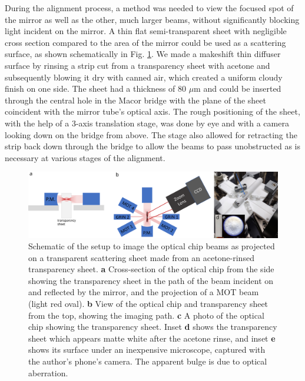 During the alignment process, a method was needed to view the focused spot of the mirror as well as the other, much larger beams, without significantly blocking light incident on the mirror. A thin flat semi-transparent sheet with negligible cross section compared to the area of the mirror could be used as a scattering surface, as shown schematically in Fig. \ref{fig:scattering_sheet_method}. We made a makeshift thin diffuser surface by rinsing a strip cut from a transparency sheet with acetone and subsequently blowing it dry with canned air, which created a uniform cloudy finish on one side. The sheet had a thickness of 80 $\mu \mathrm{m}$ and could be inserted through the central hole in the Macor bridge with the plane of the sheet coincident with the mirror tube’s optical axis. The rough positioning of the sheet, with the help of a 3-axis translation stage, was done by eye and with a camera looking down on the bridge from above. The stage also allowed for retracting the strip back down through the bridge to allow the beams to pass unobstructed as is necessary at various stages of the alignment.

\begin{figure}[t!]
    \centering
    \includegraphics[width=\textwidth]{Images/beam_projection_imaging_schematic.pdf}
    \caption{Schematic of the setup to image the optical chip beams as projected on a transparent scattering sheet made from an acetone-rinsed transparency sheet.  \textbf{a} Cross-section of the optical chip from the side showing the transparency sheet in the path of the beam incident on and reflected by the mirror, and the projection of a MOT beam (light red oval). \textbf{b} View of the optical chip and transparency sheet from the top, showing the imaging path. \textbf{c} A photo of the optical chip showing the transparency sheet. Inset \textbf{d} shows the transparency sheet which appears matte white after the acetone rinse, and inset \textbf{e} shows its surface under an inexpensive microscope, captured with the author's phone's camera. The apparent bulge is due to optical aberration.}
    \label{fig:scattering_sheet_method}
\end{figure}

